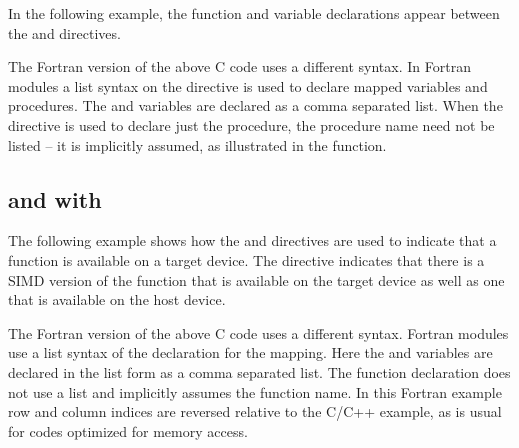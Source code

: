 In the following example, the function and variable declarations appear between 
the   and    
directives.


The Fortran version of the above C code uses a different syntax. In Fortran modules 
a list syntax on the   directive is used to declare 
mapped variables and procedures. The  and  variables are declared as a comma 
separated list. When the   directive is used to 
declare just the procedure, the procedure name need not be listed -- it is implicitly 
assumed, as illustrated in the  function.


\subsection{  and    with  }
\label{subsec:declare_target_simd}

The following example shows how the   and  
  directives are used to indicate that a function 
is available on a target device. The   directive indicates 
that there is a SIMD version of the function  that is available on the target 
device as well as one that is available on the host device.


The Fortran version of the above C code uses a different syntax. Fortran modules 
use a list syntax of the   declaration for the mapping. 
Here the  and  variables are declared in the list form as a comma separated list. 
The function declaration does not use a list and implicitly assumes the function 
name. In this Fortran example row and column indices are reversed relative to the 
C/C++ example, as is usual for codes optimized for memory access.


